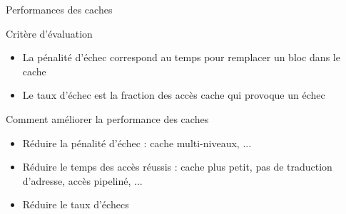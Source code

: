 %
\begin{Frame}{Performances des caches}


      \begin{block}{Critère d'évaluation}
       \begin{center}
 	\begin{itemize}
         \item La pénalité d'échec correspond au temps pour remplacer un bloc dans le cache
         \item Le taux d'échec est la fraction des accès cache qui provoque un échec
        \end{itemize}
       \end{center}
      \end{block}   

  


  

  \begin{block}{Comment améliorer la performance des caches}
    \begin{center}
 	\begin{itemize}
        \item Réduire la pénalité d'échec : cache multi-niveaux, ...
        \item Réduire le temps des accès réussis : cache plus petit, pas de traduction d'adresse, accès pipeliné, ...
	\item Réduire le taux d'échecs
        \end{itemize}
    \end{center}
  \end{block}   

 

\end{Frame}


